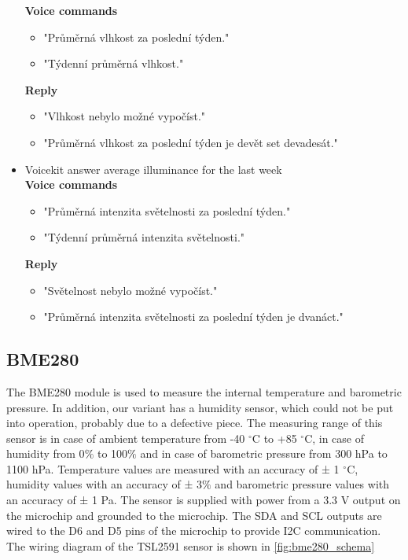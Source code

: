 \begin{itemize}
    \textbf{Voice commands}
    \begin{itemize}
        \item "Průměrná vlhkost za poslední týden."
        \item "Týdenní průměrná vlhkost."
    \end{itemize}
    \textbf{Reply}
    \begin{itemize}
        \item "Vlhkost nebylo možné vypočíst."
        \item "Průměrná vlhkost za poslední týden je devět set devadesát."
    \end{itemize}
    \item Voicekit answer average illuminance for the last week\\
    \textbf{Voice commands}
    \begin{itemize}
        \item "Průměrná intenzita světelnosti za poslední týden."
        \item "Týdenní průměrná intenzita světelnosti."
    \end{itemize}
    \textbf{Reply}
    \begin{itemize}
        \item "Světelnost nebylo možné vypočíst."
        \item "Průměrná intenzita světelnosti za poslední týden je dvanáct."
    \end{itemize}
\end{itemize}

\subsection{BME280}

The BME280 \citep{BME280:Datasheet} module is used to measure the internal temperature and barometric pressure. In addition, our variant has a humidity sensor, which could not be put into operation, probably due to a defective piece. The measuring range of this sensor is in case of ambient temperature from -40 $^{\circ}$C to +85 $^{\circ}$C, in case of humidity from 0$\%$ to 100$\%$ and in case of barometric pressure from 300 hPa to 1100 hPa. Temperature values are measured with an accuracy of ± 1 $^{\circ}$C, humidity values with an accuracy of ± 3$\%$ and barometric pressure values with an accuracy of ± 1 Pa. The sensor is supplied with power from a 3.3 V output on the microchip and grounded to the microchip. The SDA and SCL outputs are wired to the D6 and D5 pins of the microchip to provide I2C communication. The wiring diagram of the TSL2591 sensor is shown in \cref{fig:bme280_schema}

